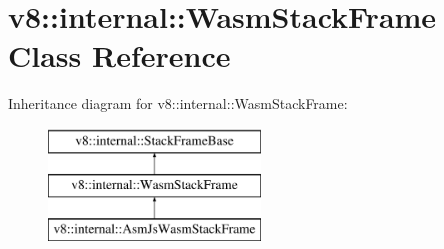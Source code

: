 \hypertarget{classv8_1_1internal_1_1WasmStackFrame}{}\section{v8\+:\+:internal\+:\+:Wasm\+Stack\+Frame Class Reference}
\label{classv8_1_1internal_1_1WasmStackFrame}
Inheritance diagram for v8\+:\+:internal\+:\+:Wasm\+Stack\+Frame\+:\begin{figure}[H]
\begin{center}
\leavevmode
\includegraphics[height=3.000000cm]{classv8_1_1internal_1_1WasmStackFrame}
\end{center}
\end{figure}
